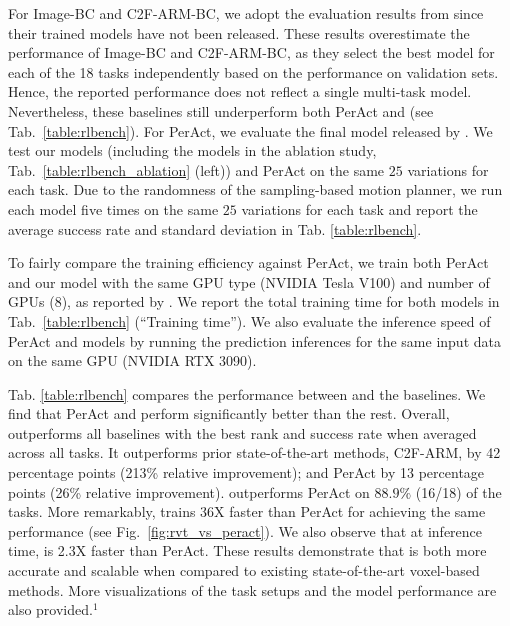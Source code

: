 For Image-BC and C2F-ARM-BC, we adopt the evaluation results from \cite{peract2022arxiv} since their trained models have not been released. These results overestimate the performance of Image-BC and C2F-ARM-BC, as they select the best model for each of the 18 tasks independently based on the performance on validation sets. Hence, the reported performance does not reflect a single multi-task model. Nevertheless, these baselines still underperform both PerAct and \method (see Tab.~\ref{table:rlbench}). For PerAct, we evaluate the final model released by \citet{peract2022arxiv}.  We test our models (including the models in the ablation study, Tab.~\ref{table:rlbench_ablation} (left)) and PerAct on the same $25$ variations for each task. Due to the randomness of the sampling-based motion planner, we run each model five times on the same $25$ variations for each task and report the average success rate and standard deviation in Tab. \ref{table:rlbench}.

To fairly compare the training efficiency against PerAct, we train both PerAct and our model with the same GPU type (NVIDIA Tesla V100) and number of GPUs (8), as reported by \citet{peract2022arxiv}. We report the total training time for both models in Tab.~\ref{table:rlbench} (``Training time''). We also evaluate the inference speed of PerAct and \method models by running the prediction inferences for the same input data on the same GPU (NVIDIA RTX 3090). 

Tab. \ref{table:rlbench} compares the performance between \method and the baselines. We find that PerAct and \method perform significantly better than the rest.
Overall, \method outperforms all baselines with the best rank and success rate when averaged across all tasks. It outperforms prior state-of-the-art methods, C2F-ARM, by 42 percentage points (213\% relative improvement); and PerAct by 13 percentage points (26\% relative improvement). \method outperforms PerAct on $88.9\%$ (16/18) of the tasks. More remarkably, \method trains 36X faster than PerAct for achieving the same performance (see Fig.~\ref{fig:rvt_vs_peract}). We also observe that at inference time, \method is 2.3X faster than PerAct. 
These results demonstrate that \method is both more accurate and scalable when compared to existing state-of-the-art voxel-based methods. More visualizations of the task setups and the model performance are also provided.$^1$

